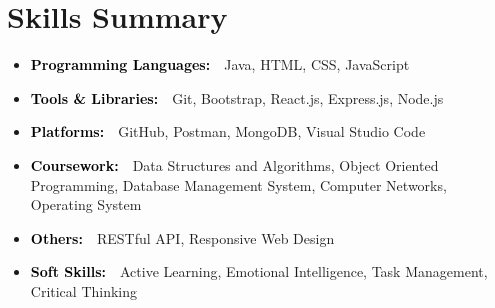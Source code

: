 \documentclass[a4paper,20pt]{article}
\begin{document}

\section{Skills Summary}
\vspace{5pt}
\begin{itemize}[label=\textbullet, labelsep=0.5em, left=0.5em, itemsep=-0.2em]
  \item \textcolor{black}{\textbf{Programming Languages:}}{\small{{~~Java, HTML, CSS, JavaScript}}}
  \item \textcolor{black}{\textbf{Tools \& Libraries:}}{\small{{~~Git, Bootstrap, React.js, Express.js, Node.js}}}
  \item \textcolor{black}{\textbf{Platforms:}}{\small{{~~GitHub, Postman, MongoDB, Visual Studio Code}}}
  \item \textcolor{black}{\textbf{Coursework:}}{\small{{~~Data Structures and Algorithms, Object Oriented Programming, Database Management System, Computer Networks, Operating System}}}
  \item \textcolor{black}{\textbf{Others:}}{\small{{~~RESTful API, Responsive Web Design}}}
  \item \textcolor{black}{\textbf{Soft Skills:}}{\small{{~~Active Learning, Emotional Intelligence, Task Management, Critical Thinking}}}
\end{itemize}
\vspace{4pt}


\end{document}
